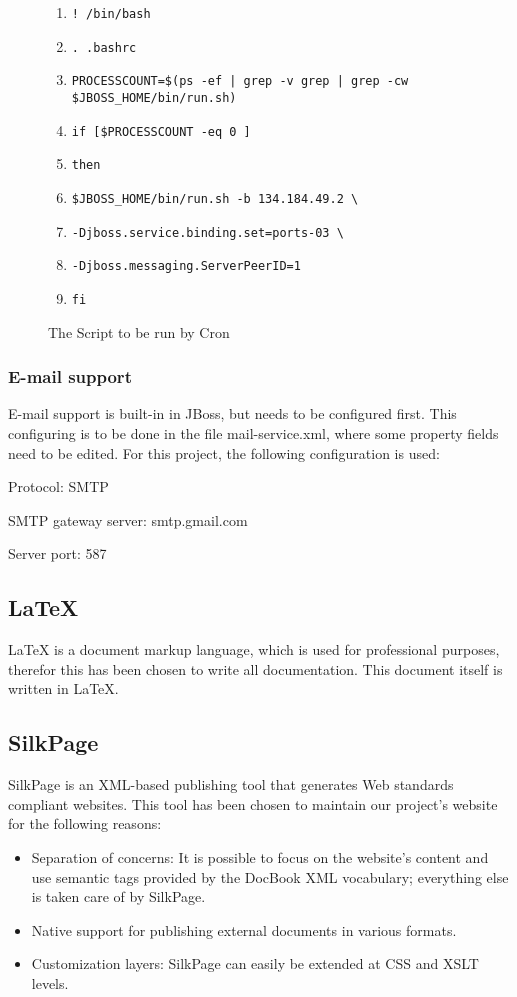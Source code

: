 \begin{figure}[hb]
\caption{The Script to be run by Cron}
\label{SalesmenInitialisationScript}
\begin{enumerate}
\item \verb*#! /bin/bash#
\item \verb*#. .bashrc#
\item \verb*#PROCESSCOUNT=$(ps -ef | grep -v grep | grep -cw $JBOSS_HOME/bin/run.sh)#
\item \verb*#if [$PROCESSCOUNT -eq 0 ]#
\item \verb*#then#
\item \verb*#$JBOSS_HOME/bin/run.sh -b 134.184.49.2 \#
\item \verb*#-Djboss.service.binding.set=ports-03 \#
\item \verb*#-Djboss.messaging.ServerPeerID=1#
\item \verb*#fi#
\end{enumerate}
\end{figure}

\subsubsection{E-mail support}
E-mail support is built-in in JBoss, but needs to be configured first.
This configuring is to be done in the file mail-service.xml, where some property fields need to be edited.
For this project, the following configuration is used:
\begin{description}
\item Protocol: SMTP
\item SMTP gateway server: smtp.gmail.com
\item Server port: 587
\end{description}

\subsection{LaTeX}
LaTeX is a document markup language, which is used for professional purposes, therefor this has been chosen to write all documentation.
This document itself is written in LaTeX.

\subsection{SilkPage}
SilkPage is an XML-based publishing tool that generates Web standards 
compliant websites.
This tool has been chosen to maintain our project's website for the following reasons:
\begin{itemize}
\item Separation of concerns: It is possible to focus on the website's content 
  and use semantic tags provided by the DocBook XML vocabulary; 
  everything else is taken care of by SilkPage.
\item Native support for publishing external documents in various formats.
\item Customization layers: SilkPage can easily be extended at CSS and
  XSLT levels.
\end{itemize}

